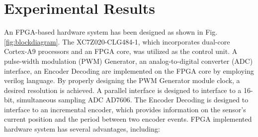 \documentclass[a4paper, 8pt, twocolumn]{IEEEtran}
\begin{document}
\section{Experimental Results}
An FPGA-based hardware system has been designed as shown in Fig. \ref{fig:blockdiagram}. The XC7Z020-CLG484-1, which incorporates dual-core Cortex-A9 processors and an FPGA core, was utilized as the control unit. A pulse-width modulation (PWM) Generator, an analog-to-digital converter (ADC) interface, an Encoder Decoding are implemented on the FPGA core by employing verilog language. By properly designing the PWM Generator module clock, a desired resolution is achieved. A parallel interface is designed to interface to a 16-bit, simultaneous sampling ADC AD7606. The Encoder Decoding is designed to interface to an incremental encoder, which provides information on the sensor's current position and the period between two encoder events. 
\iffalse
FPGA implemented hardware system has several advantages, including:
\end{document}
